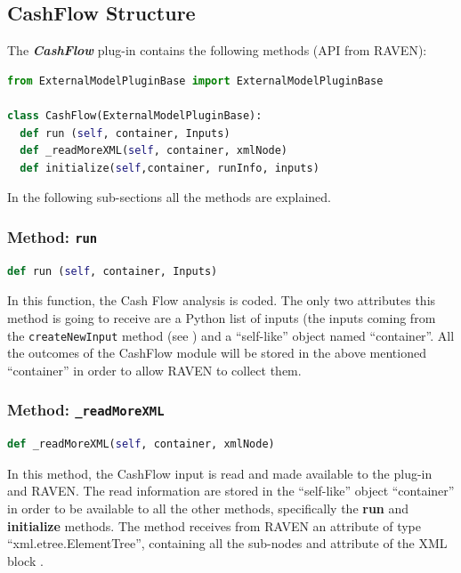 \subsection{CashFlow Structure}
The  \textit{\textbf{CashFlow}} plug-in contains the following methods (API from RAVEN):

\begin{lstlisting}[language=python]
from ExternalModelPluginBase import ExternalModelPluginBase

class CashFlow(ExternalModelPluginBase):
  def run (self, container, Inputs)
  def _readMoreXML(self, container, xmlNode)
  def initialize(self,container, runInfo, inputs)
\end{lstlisting}
In the following sub-sections all the methods are explained.
\subsubsection{Method: \texttt{run}}
\label{subsubsec:runExternalModelPlugin}
\begin{lstlisting}[language=python]
def run (self, container, Inputs)
\end{lstlisting}

In this function, the Cash Flow analysis is coded.
%
The only two attributes this method is going to receive are a Python list of inputs
(the inputs coming from the \texttt{createNewInput} method (see \cite{RAVENuserManual}) and a ``self-like'' object
named ``container''.
%
All the outcomes of the CashFlow module will be stored in the above mentioned ``container'' in order to 
allow RAVEN to collect them.

\subsubsection{Method: \texttt{\_readMoreXML}}
\label{subsubsec:externalReadMoreXMLExternalModelPlugin}
\begin{lstlisting}[language=python]
def _readMoreXML(self, container, xmlNode)
\end{lstlisting}
In this method, the CashFlow input is read and made available to the plug-in and RAVEN.
%
The read information are stored in the ``self-like'' object ``container''
 in order to be available to all the other methods, specifically the  \textbf{run} and  \textbf{initialize} methods. 
%
The method receives from RAVEN an attribute of type ``xml.etree.ElementTree'',
containing all the sub-nodes and attribute of the XML block .
%

